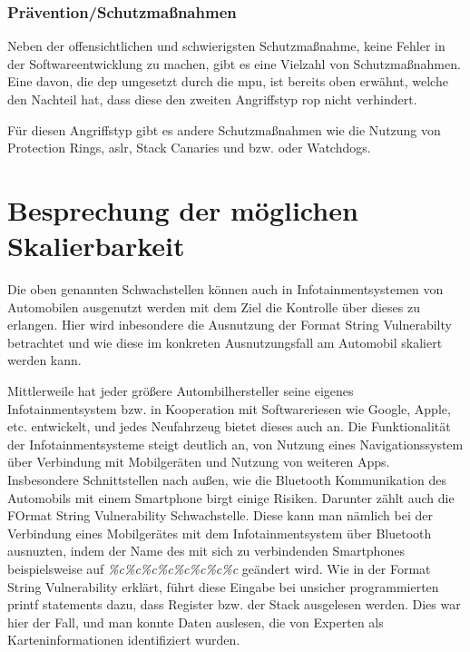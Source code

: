 \documentclass[a4paper,
DIV=13,
12pt,
BCOR=10mm,
department=FakIM,
oneside,
parskip=half,
automark,
listof=totocnumbered,
bibliography=totocnumbered,
acronym=totocnumbered
] {OTHRartcl}
\begin{document}
\subsubsection{Prävention/Schutzmaßnahmen}
Neben der offensichtlichen und schwierigsten Schutzmaßnahme, keine Fehler in der Softwareentwicklung zu machen, gibt es eine Vielzahl von Schutzmaßnahmen.
Eine davon, die \ac*{dep} umgesetzt durch die \ac*{mpu}, ist bereits oben erwähnt, welche den Nachteil hat, dass diese den zweiten Angriffstyp \ac*{rop} nicht verhindert.

Für diesen Angriffstyp gibt es andere Schutzmaßnahmen wie die Nutzung von Protection Rings, \ac*{aslr}, Stack Canaries und bzw. oder Watchdogs.


\newpage
\section{Besprechung der möglichen Skalierbarkeit}
Die oben genannten Schwachstellen können auch in Infotainmentsystemen von Automobilen ausgenutzt werden mit dem Ziel die Kontrolle über dieses zu erlangen.
Hier wird inbesondere die Ausnutzung der Format String Vulnerabilty betrachtet und wie diese im konkreten Ausnutzungsfall am Automobil skaliert werden kann.

Mittlerweile hat jeder größere Autombilhersteller seine eigenes Infotainmentsystem bzw. in Kooperation mit Softwareriesen wie Google, Apple, etc. entwickelt, und jedes Neufahrzeug
bietet dieses auch an. Die Funktionalität der Infotainmentsysteme steigt deutlich an, von Nutzung eines Navigationssystem über Verbindung mit Mobilgeräten und Nutzung von weiteren Apps.
Insbesondere Schnittstellen nach außen, wie die Bluetooth Kommunikation des Automobils mit einem Smartphone birgt einige Risiken.
Darunter zählt auch die FOrmat String Vulnerability Schwachstelle. Diese kann man nämlich bei der Verbindung eines Mobilgerätes mit dem Infotainmentsystem über Bluetooth
ausnuzten, indem der Name des mit sich zu verbindenden Smartphones beispielsweise auf \textit{\%c\%c\%c\%c\%c\%c\%c\%c} geändert wird.
Wie in der Format String Vulnerability erklärt, führt diese Eingabe bei unsicher programmierten printf statements dazu, dass Register bzw. der Stack ausgelesen werden.
Dies war hier der Fall, und man konnte Daten auslesen, die von Experten als Karteninformationen identifiziert wurden.
\end{document}
